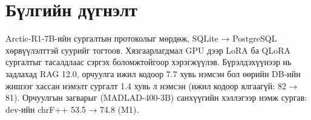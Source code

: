 \section{Бүлгийн дүгнэлт}
\label{sec:ch5-summary}

Arctic-R1-7B-ийн сургалтын протоколыг мөрдөж, SQLite → PostgreSQL хөрвүүлэлттэй суурийг тогтоов. Хязгаарлагдмал GPU дээр
LoRA ба QLoRA сургалтыг тасалдлаас сэргэх боломжтойгоор хэрэгжүүлэв. Бүрэлдэхүүнээр нь задлахад RAG 12.0, орчуулга ижил
кодоор 7.7 хувь нэмсэн бол өөрийн DB-ийн жишээг хассан нэмэлт сургалт 1.4 хувь л нэмсэн (ижил кодоор ялгаагүй: 82 → 81).
Орчуулгын загварыг (MADLAD-400-3B) санхүүгийн хэллэгээр нэмж сургав: dev-ийн chrF++ 53.5 → 74.8 (M1).
